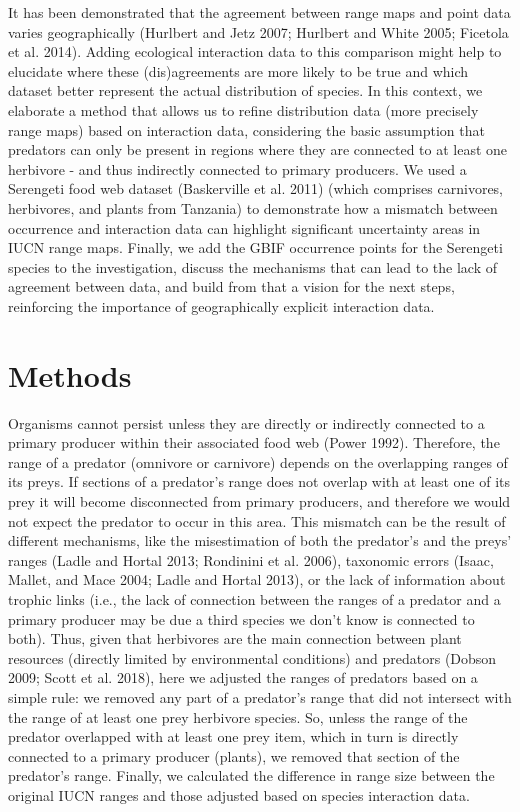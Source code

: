 \documentclass[10pt,oneside]{article}
\begin{document}
It has been demonstrated that the agreement between range maps and point
data varies geographically (Hurlbert and Jetz 2007; Hurlbert and White
2005; Ficetola et al. 2014). Adding ecological interaction data to this
comparison might help to elucidate where these (dis)agreements are more
likely to be true and which dataset better represent the actual
distribution of species. In this context, we elaborate a method that
allows us to refine distribution data (more precisely range maps) based
on interaction data, considering the basic assumption that predators can
only be present in regions where they are connected to at least one
herbivore - and thus indirectly connected to primary producers. We used
a Serengeti food web dataset (Baskerville et al. 2011) (which comprises
carnivores, herbivores, and plants from Tanzania) to demonstrate how a
mismatch between occurrence and interaction data can highlight
significant uncertainty areas in IUCN range maps. Finally, we add the
GBIF occurrence points for the Serengeti species to the investigation,
discuss the mechanisms that can lead to the lack of agreement between
data, and build from that a vision for the next steps, reinforcing the
importance of geographically explicit interaction data.

\hypertarget{methods}{%
\section{Methods}\label{methods}}

Organisms cannot persist unless they are directly or indirectly
connected to a primary producer within their associated food web (Power
1992). Therefore, the range of a predator (omnivore or carnivore)
depends on the overlapping ranges of its preys. If sections of a
predator's range does not overlap with at least one of its prey it will
become disconnected from primary producers, and therefore we would not
expect the predator to occur in this area. This mismatch can be the
result of different mechanisms, like the misestimation of both the
predator's and the preys' ranges (Ladle and Hortal 2013; Rondinini et
al. 2006), taxonomic errors (Isaac, Mallet, and Mace 2004; Ladle and
Hortal 2013), or the lack of information about trophic links (i.e., the
lack of connection between the ranges of a predator and a primary
producer may be due a third species we don't know is connected to both).
Thus, given that herbivores are the main connection between plant
resources (directly limited by environmental conditions) and predators
(Dobson 2009; Scott et al. 2018), here we adjusted the ranges of
predators based on a simple rule: we removed any part of a predator's
range that did not intersect with the range of at least one prey
herbivore species. So, unless the range of the predator overlapped with
at least one prey item, which in turn is directly connected to a primary
producer (plants), we removed that section of the predator's range.
Finally, we calculated the difference in range size between the original
IUCN ranges and those adjusted based on species interaction data.
\end{document}
